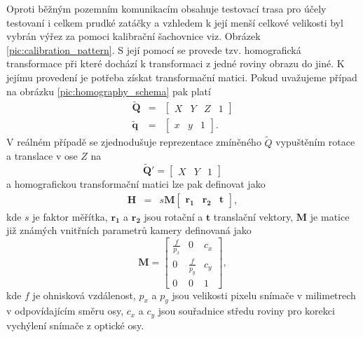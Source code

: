 \documentclass[czech, bc, kky, he, iso690numb]{fasthesis}
\begin{document}
            	Oproti běžným pozemním komunikacím obsahuje testovací trasa pro účely testovaní i celkem prudké zatáčky a vzhledem k její menší celkové velikosti byl vybrán výřez za pomoci kalibrační šachovnice viz. Obrázek \ref{pic:calibration_pattern}. S její pomocí se provede tzv. homografická transformace při které dochází k transformaci z jedné roviny obrazu do jiné. K jejímu provedení je potřeba získat transformační matici. Pokud uvažujeme případ na obrázku \ref{pic:homography_schema} pak platí
	            	\begin{eqnarray}
	            		\widetilde{\mathbf{Q}} &=& \begin{bmatrix}X&Y&Z&1\end{bmatrix}\\
	            		\widetilde{\mathbf{q}} &=& \begin{bmatrix}x&y&1\end{bmatrix}.
	            	\end{eqnarray}
	            V reálném případě se zjednodušuje reprezentace zmíněného \(\tilde{Q}\) vypuštěním rotace a translace v ose \(Z\) na 
	            	\begin{equation}
	            		\widetilde{\mathbf{Q}}' = \begin{bmatrix}X&Y&1\end{bmatrix}
	            	\end{equation}
	            a homografickou transformační matici lze pak definovat jako 
	            	\begin{eqnarray}
	            		\mathbf{\mathbf{H}} &=& s\mathbf{M}\begin{bmatrix}\mathbf{r_{1}}& \mathbf{r_{2}} & \mathbf{t}\end{bmatrix},
	            	\end{eqnarray}
	            kde \(s\) je faktor měřítka, \(\mathbf{r_{1}}\) a \(\mathbf{r_{2}}\) jsou rotační a \(\mathbf{t}\) translační vektory, \(\mathbf{M}\) je matice již známých vnitřních parametrů kamery definovaná jako
	            	\begin{equation}
	            		\mathbf{M} = 
	            		\begin{bmatrix}
	            			\frac{f}{p_{x}}&0&c_{x}\\
	            			0&\frac{f}{p_{y}}&c_{y}\\
	            			0&0&1
	            		\end{bmatrix},
	            	\end{equation}
	            kde \(f\) je ohnisková vzdálenost, \(p_{x}\) a \(p_{y}\) jsou velikosti pixelu snímače v milimetrech v odpovídajícím směru osy, \(c_{x}\) a \(c_{y}\) jsou souřadnice středu roviny pro korekci vychýlení snímače z optické osy.
	            
\end{document}
